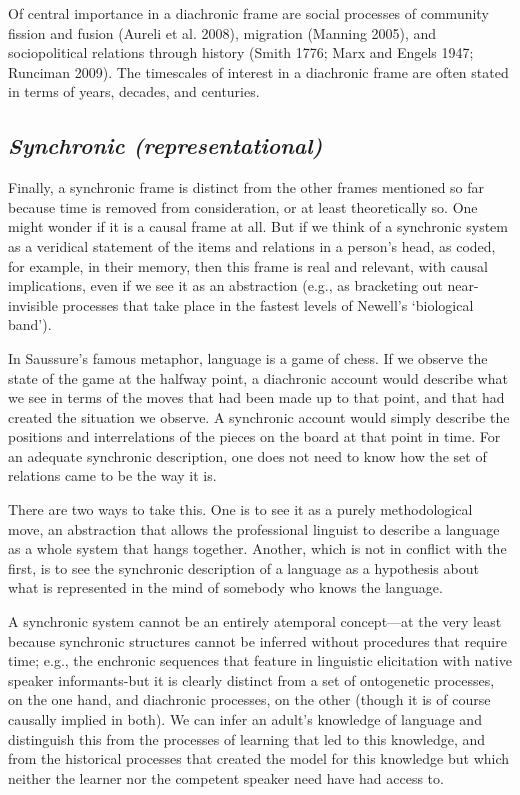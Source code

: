 Of central importance in a diachronic frame are social processes of 
community fission and fusion (Aureli et al. 2008), migration (Manning 
2005), and sociopolitical relations through history (Smith 1776; Marx 
and Engels 1947; Runciman 2009). The timescales of interest in a 
diachronic frame are often stated in terms of years, decades, and 
centuries.



\subsection{\textit{Synchronic (representational)}}



Finally, a synchronic frame is distinct from the other frames mentioned 
so far because time is removed from consideration, or at least 
theoretically so. One might wonder if it is a causal frame at all. But 
if we think of a synchronic system as a veridical statement of the items 
and relations in a person's head, as coded, for example, in their 
memory, then this frame is real and relevant, with causal implications, 
even if we see it as an abstraction (e.g., as bracketing out 
near-invisible processes that take place in the fastest levels of 
Newell's \textquoteleft biological band'). 



In Saussure's famous metaphor, language is a game of chess. If we 
observe the state of the game at the halfway point, a diachronic account 
would describe what we see in terms of the moves that had been made up 
to that point, and that had created the situation we observe. A 
synchronic account would simply describe the positions and 
interrelations of the pieces on the board at that point in time. For an 
adequate synchronic description, one does not need to know how the set 
of relations came to be the way it is. 



There are two ways to take this. One is to see it as a purely 
methodological move, an abstraction that allows the professional 
linguist to describe a language as a whole system that hangs together. 
Another, which is not in conflict with the first, is to see the 
synchronic description of a language as a hypothesis about what is 
represented in the mind of somebody who knows the language. 



A synchronic system cannot be an entirely atemporal concept---at the very 
least because synchronic structures cannot be inferred without 
procedures that require time; e.g., the enchronic sequences that feature 
in linguistic elicitation with native speaker informants-but it is 
clearly distinct from a set of ontogenetic processes, on the one hand, 
and diachronic processes, on the other (though it is of course causally 
implied in both). We can infer an adult's knowledge of language and 
distinguish this from the processes of learning that led to this 
knowledge, and from the historical processes that created the model for 
this knowledge but which neither the learner nor the competent speaker 
need have had access to. 



